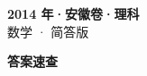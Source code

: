 \documentclass[zihao=-4, a4paper]{ctexart}
\begin{document}
\begin{center}
  {\Large\bfseries 2014 年·安徽卷·理科}\\[4pt]
  {\large 数学 · 简答版}
\end{center}
\medskip
{}

\clearpage
{}
\begin{center}{\Large\bfseries 答案速查}\end{center}
\medskip

\end{document}
